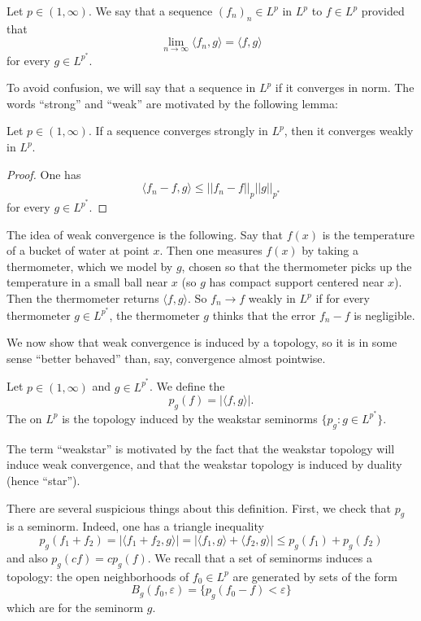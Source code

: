 \begin{definition}
Let $p \in (1, \infty)$. We say that a sequence ${(f_{n})}_{n} \in L^{p}$  in $L^{p}$ to $f \in L^{p}$ provided that
\[\lim_{n \to \infty} \langle f_{n}, g\rangle = \langle f, g\rangle\]
for every $g \in L^{p^{*}}$.
\end{definition}

To avoid confusion, we will say that a sequence  in $L^{p}$ if it converges in norm.
The words ``strong'' and ``weak'' are motivated by the following lemma:

\begin{lemma}
Let $p \in (1, \infty)$. If a sequence converges strongly in $L^{p}$, then it converges weakly in $L^{p}$.
\end{lemma}
\begin{proof}
One has
\[\langle f_{n} - f, g \rangle \leq ||f_{n} - f||_{p}  ||g||_{p^{*}}\]
for every $g \in L^{p^{*}}$.
\end{proof}

The idea of weak convergence is the following. Say that $f(x)$ is the temperature of a bucket of water at point $x$.
Then one measures $f(x)$ by taking a thermometer, which we model by $g$, chosen so that the thermometer picks up the temperature in a small ball near $x$ (so $g$ has compact support centered near $x$).
Then the thermometer returns $\langle f, g\rangle$.
So $f_{n} \to f$ weakly in $L^{p}$ if for every thermometer $g \in L^{p^{*}}$, the thermometer $g$ thinks that the error $f_{n} - f$ is negligible.

We now show that weak convergence is induced by a topology, so it is in some sense ``better behaved'' than, say, convergence almost pointwise.

\begin{definition}
Let $p \in (1, \infty)$ and $g \in L^{p^{*}}$.
We define the 
\[p_{g}(f) = |\langle f, g\rangle|.\]
The  on $L^{p}$ is the topology induced by the weakstar seminorms $\{p_{g}: g \in L^{p^{*}}\}$.
\end{definition}

The term ``weakstar'' is motivated by the fact that the weakstar topology will induce weak convergence, and that the weakstar topology is induced by duality (hence ``star'').

There are several suspicious things about this definition. First, we check that $p_{g}$ is a seminorm. Indeed, one has a triangle inequality
\[p_{g}(f_{1} + f_{2}) = |\langle f_{1} + f_{2}, g\rangle| = |\langle f_{1}, g\rangle + \langle f_{2}, g\rangle| \leq p_{g}(f_{1}) + p_{g}(f_{2})\]
and also $p_{g}(cf) = cp_{g}(f)$.
We recall that a set of seminorms induces a topology: the open neighborhoods of $f_{0} \in L^{p}$ are generated by sets of the form
\[B_{g}(f_{0}, \varepsilon) = \{p_{g}(f_{0} - f) < \varepsilon\}\]
which are  for the seminorm $g$.

